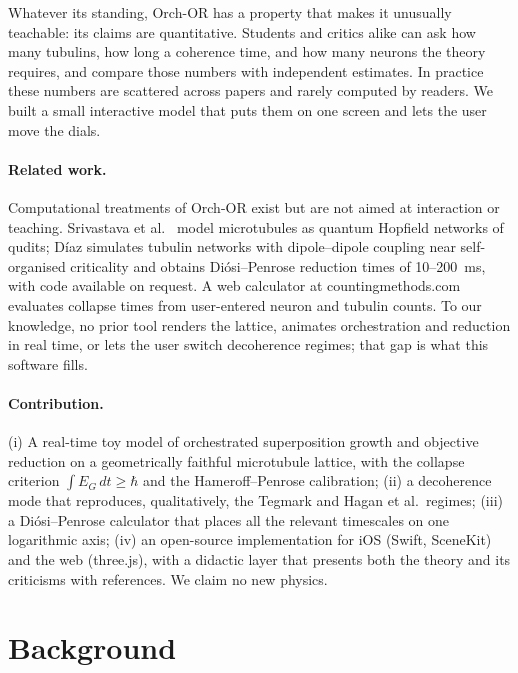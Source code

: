 \documentclass[11pt]{article}
\begin{document}
Whatever its standing, Orch-OR has a property that makes it unusually teachable: its claims are quantitative. Students and critics alike can ask how many tubulins, how long a coherence time, and how many neurons the theory requires, and compare those numbers with independent estimates. In practice these numbers are scattered across papers and rarely computed by readers. We built a small interactive model that puts them on one screen and lets the user move the dials.


\paragraph{Related work.} Computational treatments of Orch-OR exist but are not aimed at interaction or teaching. Srivastava et al.\ \citep{srivastava2015} model microtubules as quantum Hopfield networks of qudits; D\'iaz \citep{diaz2025} simulates tubulin networks with dipole--dipole coupling near self-organised criticality and obtains Di\'osi--Penrose reduction times of 10--200~ms, with code available on request. A web calculator at countingmethods.com \citep{countingmethods} evaluates collapse times from user-entered neuron and tubulin counts. To our knowledge, no prior tool renders the lattice, animates orchestration and reduction in real time, or lets the user switch decoherence regimes; that gap is what this software fills.

\paragraph{Contribution.} (i) A real-time toy model of orchestrated superposition growth and objective reduction on a geometrically faithful microtubule lattice, with the collapse criterion $\int E_G\,dt \ge \hbar$ and the Hameroff--Penrose calibration; (ii) a decoherence mode that reproduces, qualitatively, the Tegmark and Hagan et al.\ regimes; (iii) a Di\'osi--Penrose calculator that places all the relevant timescales on one logarithmic axis; (iv) an open-source implementation for iOS (Swift, SceneKit) and the web (three.js), with a didactic layer that presents both the theory and its criticisms with references. We claim no new physics.

\section{Background}
\end{document}
